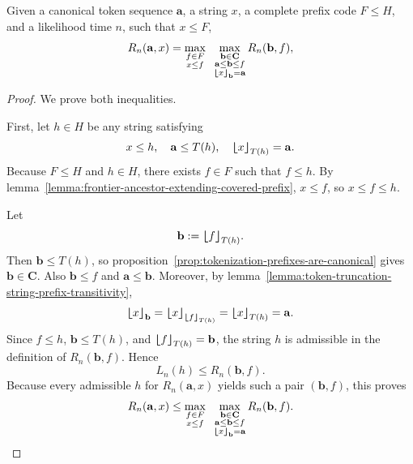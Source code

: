 \begin{theorem}
\label{theorem:truncation-compatible-descendant-likelihood-from-frontier}
Given a canonical token sequence $\mathbf{a}$, a string $x$, a complete prefix code $F \leq H$,
and a likelihood time $n$,
such that $x \leq F$,
$$
R_n(\mathbf{a}, x) =
    \max_{\substack{
        f \in F \\
        x \leq f
    }}
    \;\;
    \max_{\substack{
        \mathbf{b} \in \mathbf{C} \\
        \mathbf{a} \leq \mathbf{b} \leq f \\
        {\bm{\lfloor}} x {\bm{\rfloor}}_{\mathbf{b}} = \mathbf{a}
    }} 
    R_n(\mathbf{b}, f),
$$
\end{theorem}
\begin{proof}
    We prove both inequalities.

    First, let $h \in H$ be any string satisfying
    $$
    x \leq h, \quad \mathbf{a} \leq T(h), \quad {\bm{\lfloor}} x {\bm{\rfloor}}_{T(h)} = \mathbf{a}.
    $$
    Because $F \leq H$ and $h \in H$, there exists $f \in F$ such that $f \leq h$.
    By lemma~\ref{lemma:frontier-ancestor-extending-covered-prefix}, $x \leq f$, so
    $x \leq f \leq h$.

    Let
    $$
    \mathbf{b} := {\bm{\lfloor}} f {\bm{\rfloor}}_{T(h)}.
    $$
    Then $\mathbf{b} \leq T(h)$, so proposition~\ref{prop:tokenization-prefixes-are-canonical}
    gives $\mathbf{b} \in \mathbf{C}$. Also $\mathbf{b} \leq f$ and $\mathbf{a} \leq \mathbf{b}$.
    Moreover, by lemma~\ref{lemma:token-truncation-string-prefix-transitivity},
    $$
    {\bm{\lfloor}} x {\bm{\rfloor}}_{\mathbf{b}}
    =
    {\bm{\lfloor}} x {\bm{\rfloor}}_{{\bm{\lfloor}} f {\bm{\rfloor}}_{T(h)}}
    =
    {\bm{\lfloor}} x {\bm{\rfloor}}_{T(h)}
    =
    \mathbf{a}.
    $$
    Since $f \leq h$, $\mathbf{b} \leq T(h)$, and ${\bm{\lfloor}} f {\bm{\rfloor}}_{T(h)} = \mathbf{b}$,
    the string $h$ is admissible in the definition of $R_n(\mathbf{b}, f)$.
    Hence
    $$
    L_n(h) \leq R_n(\mathbf{b}, f).
    $$
    Because every admissible $h$ for $R_n(\mathbf{a}, x)$ yields such a pair $(\mathbf{b}, f)$,
    this proves
    $$
    R_n(\mathbf{a}, x)
    \leq
    \max_{\substack{
        f \in F \\
        x \leq f
    }}
    \;\;
    \max_{\substack{
        \mathbf{b} \in \mathbf{C} \\
        \mathbf{a} \leq \mathbf{b} \leq f \\
        {\bm{\lfloor}} x {\bm{\rfloor}}_{\mathbf{b}} = \mathbf{a}
    }}
    R_n(\mathbf{b}, f).
    $$


\end{proof}
